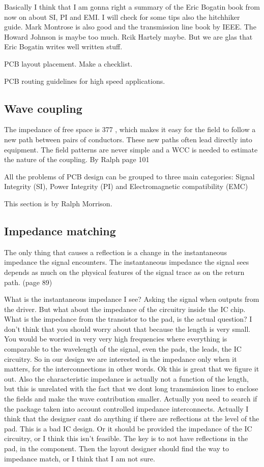 \documentclass[12pt]{article}
\begin{document}
Basically I think that I am gonna right a summary of the Eric Bogatin book from now on about SI, PI and EMI. I will check for some tips also the hitchhiker guide. Mark Montrose is also good and the transmission line book by IEEE. The Howard Johnson is maybe too much. Rcik Hartely maybe. But we are glas that Eric Bogatin writes well written stuff.



PCB layout placement. Make a checklist.

PCB routing guidelines for high speed applications.
\subsection{Wave coupling}
The impedance of free space is 377 ­, which makes it easy for the field to follow a new path between pairs of conductors. These new paths often lead directly into equipment. The field patterns are never simple and a WCC is needed to estimate the nature of the coupling. By Ralph page 101

All the problems of PCB design can be grouped to three main categories: Signal Integrity (SI), Power Integrity (PI) and Electromagnetic compatibility (EMC)

This section is by Ralph Morrison.

\subsection{Impedance matching}

The only thing that causes a reflection is a change in the instantaneous impedance the signal encounters. The instantaneous impedance the signal sees depends as much on the physical features of the signal trace as on the return path. (page 89)

What is the instantaneous impedance I see? Asking the signal when outputs from the driver. But what about the impedance of the circuitry inside the IC chip. What is the impedance from the transistor to the pad, is the actual question? I don't think that you should worry about that because the length is very small. You would be worried in very very high frequencies where everything is comparable to the wavelength of the signal, even the pads, the leads, the IC circuitry. So in our design we are interested in the impedance only when it matters, for the interconnections in other words. Ok this is great that we figure it out. Also the characteristic impedance is actually not a function of the length, but this is unrelated with the fact that we dont long transmission lines to enclose the fields and make the wave contribution smaller. Actually you need to search if the package taken into account controlled impedance interconnects. Actually I think that the designer cant do anything if there are reflections at the level of the pad. This is a bad IC design. Or it should be provided the impedance of the IC circuitry, or I think this isn't feasible. The key is to not have reflections in the pad, in the component. Then the layout designer should find the way to impedance match, or I think that I am not sure. 
\end{document}
